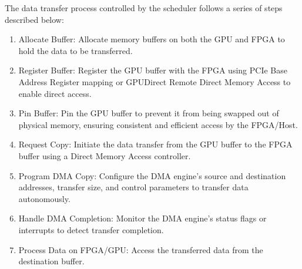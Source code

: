 The data transfer process controlled by the scheduler follows a series of steps described below: 
\begin{enumerate}
  \item Allocate Buffer: Allocate memory buffers on both the GPU and FPGA to hold the data to be transferred.
  \item Register Buffer: Register the GPU buffer with the FPGA using PCIe Base Address Register mapping or GPUDirect Remote Direct Memory Access to enable direct access.
  \item Pin Buffer: Pin the GPU buffer to prevent it from being swapped out of physical memory, ensuring consistent and efficient access by the FPGA/Host.
  \item Request Copy: Initiate the data transfer from the GPU buffer to the FPGA buffer using a Direct Memory Access controller.
  \item Program DMA Copy: Configure the DMA engine's source and destination addresses, transfer size, and control parameters to transfer data autonomously.
  \item Handle DMA Completion: Monitor the DMA engine's status flags or interrupts to detect transfer completion.
  \item Process Data on FPGA/GPU: Access the transferred data from the destination buffer.
\end{enumerate}



    
    
    
